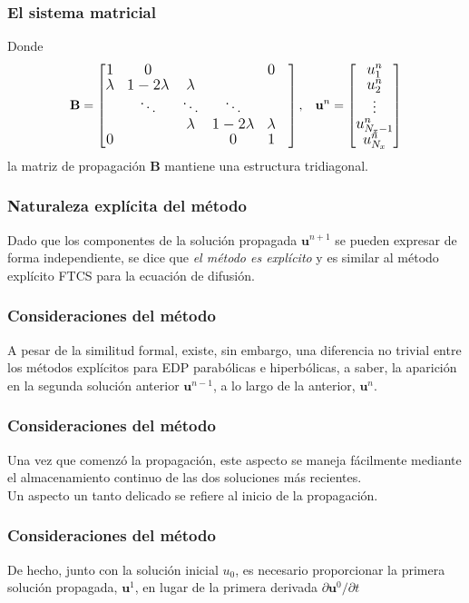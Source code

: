 \begin{frame}
\frametitle{El sistema matricial}
Donde
\begin{equation}
\fontsize{12}{12}\selectfont
\mathbf{B} = \begin{bmatrix}
1 & 0 & & & 0 \\
\lambda & 1 - 2 \lambda & \lambda & & & \\
 & \ddots & \ddots & \ddots & \\
 & & \lambda & 1 - 2 \lambda & \lambda \\
 0 & & & 0 & 1
\end{bmatrix},
\hspace{0.3cm}
\mathbf{u}^{n} = 
\begin{bmatrix}
u_{1}^{n} \\
u_{2}^{n} \\
\vdots \\
u_{N_{x} - 1}^{n} \\
u_{N_{x}}^{n} 
\end{bmatrix}
\label{eq:ecuacion_13_135}
\end{equation}
la matriz de propagación $\mathbf{B}$ mantiene una estructura tridiagonal.
\end{frame}
\begin{frame}
\frametitle{Naturaleza explícita del método}
Dado que los componentes de la solución propagada $\mathbf{u}^{n+1}$ se pueden expresar de forma independiente, se dice que \emph{el método es explícito} y es  similar al método explícito FTCS para la ecuación de difusión.
\end{frame}
\begin{frame}
\frametitle{Consideraciones del método}
A pesar de la similitud formal, existe, sin embargo, una diferencia no trivial entre los métodos explícitos para EDP parabólicas e hiperbólicas, a saber, la aparición en la segunda solución anterior $\mathbf{u}^{n-1}$, a lo largo de la anterior, $\mathbf{u}^{n}$.
\end{frame}
\begin{frame}
\frametitle{Consideraciones del método}
Una vez que comenzó la propagación, este aspecto se maneja fácilmente mediante el almacenamiento continuo de las dos soluciones más recientes.
\\
\bigskip
\pause
Un aspecto un tanto delicado se refiere al inicio de la propagación.
\end{frame}
\begin{frame}
\frametitle{Consideraciones del método}
De hecho, junto con la solución inicial $u_{0}$, es necesario proporcionar la primera solución propagada, $\mathbf{u}^{1}$, en lugar de la primera derivada $\partial \mathbf{u}^{0} / \partial t$
\end{frame}
